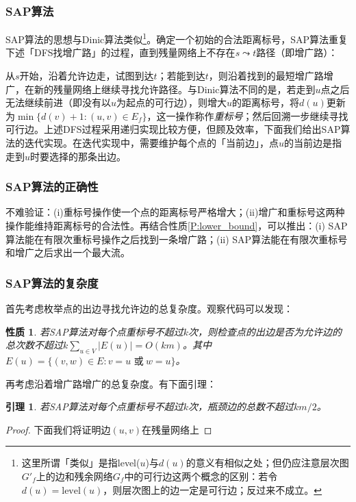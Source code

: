 \documentclass{ctexbook}
\newtheorem{lemma}{引理}[chapter]
\newtheorem{property}{性质}[chapter]
\begin{document}
  \subsubsection*{SAP算法}
  SAP算法的思想与Dinic算法类似\footnote{这里所谓「类似」是指level($u$)与$d(u)$的意义有相似之处；但仍应注意层次图$G'_f$上的边和残余网络$G_f$中的可行边这两个概念的区别：若令$d(u)=\mathrm{level}(u)$，则层次图上的边一定是可行边；反过来不成立。}。确定一个初始的合法距离标号，SAP算法重复下述「DFS找增广路」的过程，直到残量网络上不存在$s\leadsto t$路径（即增广路）：

  从$s$开始，沿着允许边走，试图到达$t$；若能到达$t$，则沿着找到的最短增广路增广，在新的残量网络上继续寻找允许路径。与Dinic算法不同的是，若走到$u$点之后无法继续前进（即没有以$u$为起点的可行边），则增大$u$的距离标号，将$d(u)$更新为$\min\{d(v)+1\colon (u,v)\in E_f\}$，这一操作称作\emph{重标号}；然后回溯一步继续寻找可行边。上述DFS过程采用递归实现比较方便，但顾及效率，下面我们给出SAP算法的迭代实现。在迭代实现中，需要维护每个点的「当前边」，点$u$的当前边是指走到$u$时要选择的那条出边。
  
  \subsubsection{SAP算法的正确性}
  不难验证：(i)重标号操作使一个点的距离标号严格增大；(ii)增广和重标号这两种操作能维持距离标号的合法性。再结合性质\ref{P:lower_bound}，可以推出：(i) SAP算法能在有限次重标号操作之后找到一条增广路；(ii) SAP算法能在有限次重标号和增广之后求出一个最大流。
  \subsubsection{SAP算法的复杂度}
  首先考虑枚举点的出边寻找允许边的总复杂度。观察代码可以发现：
  \begin{property}
    若SAP算法对每个点重标号不超过$k$次，则检查点的出边是否为允许边的总次数不超过$k\sum\limits_{u\in V}|E(u)|=O(km)$。其中$E(u)=\{(v,w)\in E\colon v= u \text{ 或}\ w = u\}$。
  \end{property}
  再考虑沿着增广路增广的总复杂度。有下面引理：
  \begin{lemma}
    若SAP算法对每个点重标号不超过$k$次，瓶颈边的总数不超过$km/2$。
  \end{lemma}
  \begin{proof}
    下面我们将证明边$(u,v)$在残量网络上
  \end{proof}
\end{document}
